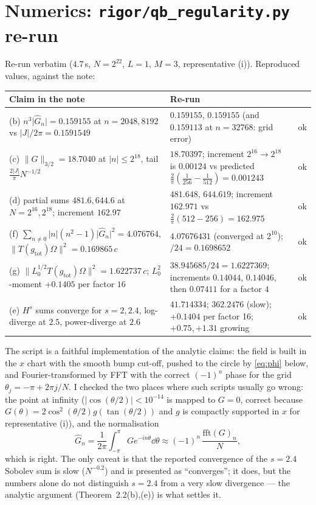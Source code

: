 \documentclass[11pt]{article}
\newcommand{\Om}{\Omega}
\newcommand{\nrm}[1]{\lVert #1\rVert}
\newcommand{\abz}[1]{\lvert #1\rvert}
\newcommand{\gtot}{g_{\mathrm{tot}}}
\begin{document}
\section{Numerics: \texttt{rigor/qb\_regularity.py} re-run}\label{sec:numerics}

Re-run verbatim (4.7\,s, $N=2^{22}$, $L=1$, $M=3$, representative (i)).  Reproduced values, against the note:
\begin{center}\small
\begin{tabularx}{\textwidth}{>{\raggedright\arraybackslash}p{} >{\raggedright\arraybackslash}X c}\toprule
Claim in the note & Re-run & \\\midrule
(b) $n^3\abz{\hat G_n}=0.159155$ at $n=2048,8192$ vs $\abz J/2\pi=0.1591549$
 & $0.159155$, $0.159155$ (and $0.159113$ at $n=32768$: grid error) & ok\\
(c) $\nrm G_{3/2}=18.7040$ at $\abz n\le2^{18}$, tail $\frac{2\abz J}\pi N^{-1/2}$
 & $18.70397$; increment $2^{16}\!\to\!2^{18}$ is $0.00124$ vs predicted $\frac2\pi(\frac1{256}-\frac1{512})=0.001243$
 & ok\\
(d) partial sums $481.6,644.6$ at $N=2^{16},2^{18}$; increment $162.97$
 & $481.648$, $644.619$; increment $162.971$ vs $\frac2\pi(512-256)=162.975$ & ok\\
(f) $\sum_{n\ne0}\abz n(n^2-1)\abz{\hat G_n}^2=4.076764$, $\nrm{T(\gtot)\Om}^2=0.169865\,c$
 & $4.07676431$ (converged at $2^{10}$); $/24=0.1698652$ & ok\\
(g) $\nrm{L_0^{1/2}T(\gtot)\Om}^2=1.622737\,c$; $L_0^2$-moment $+0.1405$ per factor $16$
 & $38.945685/24=1.6227369$; increments $0.14044$, $0.14046$, then $0.07411$ for a factor $4$ & ok\\
(e) $H^s$ sums converge for $s=2,2.4$, log-diverge at $2.5$, power-diverge at $2.6$
 & $41.714334$; $362.2476$ (slow); $+0.1404$ per factor 16; $+0.75,+1.31$ growing & ok\\
\bottomrule
\end{tabularx}
\end{center}
The script is a faithful implementation of the analytic claims: the field is built in the $x$ chart with the
smooth bump cut-off, pushed to the circle by \eqref{eq:phi} below, and Fourier-transformed by FFT with the
correct $(-1)^n$ phase for the grid $\theta_j=-\pi+2\pi j/N$.  I checked the two places where such scripts
usually go wrong: the point at infinity ($\abz{\cos(\theta/2)}<10^{-14}$ is mapped to $G=0$, correct because
$G(\theta)=2\cos^2(\theta/2)g(\tan(\theta/2))$ and $g$ is compactly supported in $x$ for representative (i)),
and the normalisation
\begin{equation}\label{eq:phi}
 \hat G_n=\frac1{2\pi}\int_{-\pi}^\pi G e^{-in\theta}\dd\theta\approx(-1)^n\,\frac{\mathrm{fft}(G)_n}N ,
\end{equation}
which is right.  The only caveat is that the reported convergence of the $s=2.4$ Sobolev sum is slow
($N^{-0.2}$) and is presented as ``converges''; it does, but the numbers alone do not distinguish $s=2.4$ from
a very slow divergence --- the analytic argument (Theorem~2.2(b),(e)) is what settles it.
\end{document}
